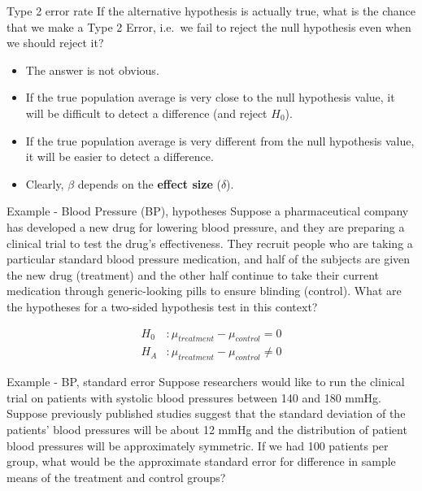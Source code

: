 \documentclass[
  ignorenonframetext,
]{beamer}
\begin{document}
\begin{frame}{Type 2 error rate}
\protect\hypertarget{type-2-error-rate}{}
If the alternative hypothesis is actually true, what is the chance that
we make a Type 2 Error, i.e.~we fail to reject the null hypothesis even
when we should reject it?

\begin{itemize}
\item
  The answer is not obvious.
\item
  If the true population average is very close to the null hypothesis
  value, it will be difficult to detect a difference (and reject
  \(H_0\)).
\item
  If the true population average is very different from the null
  hypothesis value, it will be easier to detect a difference.
\item
  Clearly, \(\beta\) depends on the \textbf{effect size} (\(\delta\)).
\end{itemize}
\end{frame}

\begin{frame}{Example - Blood Pressure (BP), hypotheses}
\protect\hypertarget{example---blood-pressure-bp-hypotheses}{}
\alert{Suppose a pharmaceutical company has developed a new drug for lowering blood pressure, and they are preparing a clinical trial to test the drug's effectiveness. They recruit people who are taking a particular standard blood pressure medication, and half of the subjects are given the new drug (treatment) and the other half continue to take their current medication through generic-looking pills to ensure blinding (control). What are the hypotheses for a two-sided hypothesis test in this context?}

\pause

\begin{align*}
H_0&: \mu_{treatment} - \mu_{control} = 0 \\
H_A&: \mu_{treatment} - \mu_{control} \ne 0  
\end{align*}
\end{frame}

\begin{frame}{Example - BP, standard error}
\protect\hypertarget{example---bp-standard-error}{}
\alert{Suppose researchers would like to run the clinical trial on patients with systolic blood pressures between 140 and 180 mmHg. Suppose previously published studies suggest that the standard deviation of the patients' blood pressures will be about 12 mmHg and the distribution of patient blood pressures will be approximately symmetric. If we had 100 patients per group, what would be the approximate standard error for difference in sample means of the treatment and control groups?}

\pause

\end{frame}
\end{document}
